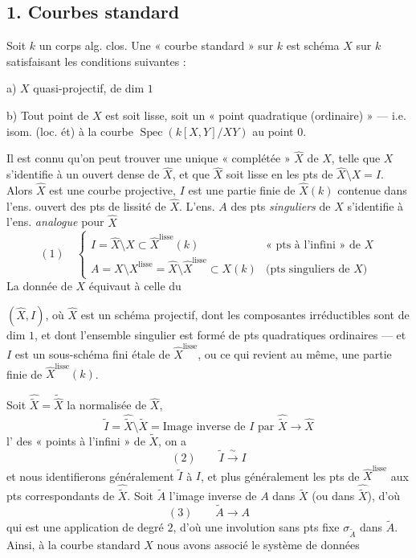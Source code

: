 \documentclass[11pt,a4paper]{article}
\begin{document}
\subsection{1. Courbes standard}

Soit $k$ un corps alg. clos. Une « courbe standard » sur $k$ est \struck{\ill{}} schéma $X$ sur $k$ satisfaisant les conditions suivantes :

a) $X$ quasi-projectif,  de dim $1$

b) Tout point de $X$ est soit lisse, soit un « point quadratique (ordinaire) » — i.e. isom. (loc. ét) à la courbe $\operatorname{Spec}(k[X,Y]/XY)$ au point $0$.

Il est connu qu'on peut trouver une unique « complétée » $\widehat{X}$ de $X$, telle que  $X$ s'identifie à un ouvert dense de $\widehat{X}$, et que $\widehat{X}$ soit lisse en les pts de $\widehat{X} \setminus X = I$. Alors $\widehat{X}$ est une courbe projective, $I$ est  une partie finie de $\widehat{X}(k)$ contenue dans l'ens. ouvert des pts de lissité de $\widehat{X}$. L'ens. $A$ des pts \emph{singuliers} de $X$ s'identifie à l'ens. \emph{analogue} pour $\widehat{X}$
\begin{equation*}
(1)\quad
\begin{cases}
I = \widehat{X} \setminus X \subset \widehat{X}^{\mathrm{lisse}}(k) & \text{« pts à l'infini » de } X\\
A = X \setminus X^{\mathrm{lisse}} = \widehat{X} \setminus \widehat{X}^{\mathrm{lisse}} \subset X(k) & \text{(pts singuliers de } X\text{)}
\end{cases}
\end{equation*}
La donnée de $X$ équivaut à celle du

$(\widehat{X}, I)$, où $\widehat{X}$ est un schéma projectif, dont les composantes irréductibles sont de dim $1$, et dont l'ensemble singulier est formé de pts quadratiques ordinaires — et $I$ est un sous-schéma fini étale de $\widehat{X}^{\mathrm{lisse}}$, ou ce qui revient au même, une partie finie de $\widehat{X}^{\mathrm{lisse}}(k)$.

Soit $\widehat{\widetilde{X}} = \widetilde{\widehat{X}}$ la normalisée de $\widehat{X}$, 
\[
\widetilde{I} = \widehat{\widetilde{X}} \setminus \widetilde{X} = \text{Image inverse de } I \text{ par } \widehat{\widetilde{X}} \to \widehat{X}
\]
l' des  « points à l'infini » de $\widetilde{X}$, on a
\[
(2)\qquad \widetilde{I} \xrightarrow{\ \sim\ } I
\]
et nous identifierons généralement $\widetilde{I}$ à $I$, et plus généralement \struck{\ill{}} les pts de $\widehat{X}^{\mathrm{lisse}}$ aux pts correspondants de $\widehat{\widetilde{X}}$. Soit $\widetilde{A}$ l'image inverse de $A$ dans $\widetilde{X}$ (ou dans $\widehat{\widetilde{X}}$), d'où
\[
(3)\qquad \widetilde{A} \longrightarrow A
\]
qui est une application de degré $2$, d'où une involution sans pts fixe $\sigma_{\widetilde{A}}$ dans $\widetilde{A}$. Ainsi, à la courbe standard $X$ nous avons associé le système de données
\end{document}
